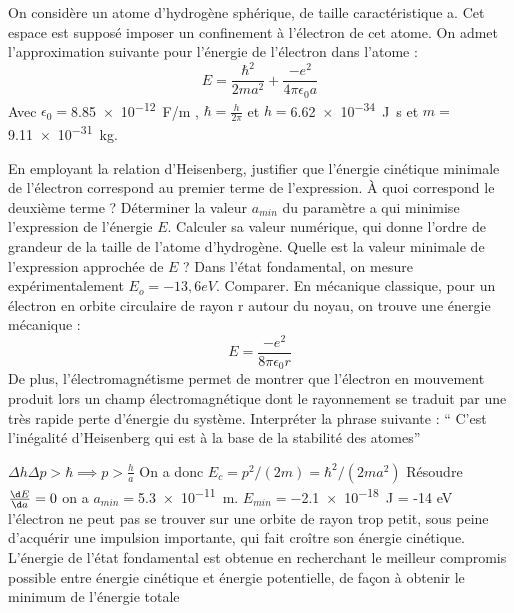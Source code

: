 \begin{Exercise}[title=Dimension de l'atome d'hydrogène]
  On considère un atome d’hydrogène sphérique, de taille caractéristique a. Cet espace est supposé imposer un confinement à l’électron de cet atome. On admet l’approximation suivante pour l’énergie de l’électron dans l’atome :
  \[
    E = \frac{\hbar^2}{2ma^2}+\frac{-e^2}{4\pi \epsilon_0 a}
  \]
  Avec $ \epsilon_0 =$\SI{8,85e-12}{F/m} , $\hbar = \frac{h}{2 \pi}$ et $h=$\SI{6,62e-34}{J.s} et $m=$\SI{9,11e-31}{kg}.

  \Question En employant la relation d’Heisenberg, justifier que l’énergie cinétique minimale de l’électron correspond au premier terme de l’expression. À quoi correspond le deuxième terme ?
  \Question Déterminer la valeur $a_{min}$ du paramètre a qui minimise l’expression de l’énergie $E$. Calculer sa valeur numérique, qui donne l’ordre de grandeur de la taille de l’atome d’hydrogène.
  \Question Quelle est la valeur minimale de l’expression approchée de $E$ ? Dans l’état fondamental, on mesure expérimentalement $E_o = -13,6 eV$. Comparer.
  \Question
  En mécanique classique, pour un électron en orbite circulaire de rayon r autour du noyau, on trouve une énergie mécanique :
  \[
    E = \frac{-e^2}{8\pi\epsilon_0 r}
  \]
  De plus, l’électromagnétisme permet de montrer que l’électron en mouvement produit lors un champ électromagnétique dont le rayonnement se traduit par une très rapide perte d’énergie du système. Interpréter  la  phrase  suivante : `` C’est  l’inégalité  d’Heisenberg  qui est  à  la  base  de  la  stabilité  des atomes''
\end{Exercise}
\begin{Answer}
  \Question $\Delta h \Delta p > \hbar \implies p > \frac{h}{a}$ On a donc $E_c= p^2/(2m) =\hbar^2/(2ma^2)$
\Question Résoudre $\frac{\d E }{\d a} = 0$ on a $a_{min}=$\SI{5,3e-11}{m}.
\Question $E_{min} = $\SI{-2,1e-18}{J} = -14 eV
\Question
 l’électron ne peut pas se trouver sur une orbite de rayon trop petit, sous peine d’acquérir une impulsion importante, qui fait croître son énergie cinétique. L’énergie de l’état fondamental est obtenue en recherchant le meilleur compromis possible entre énergie cinétique et énergie potentielle, de façon à obtenir le minimum de l’énergie totale
\end{Answer}
